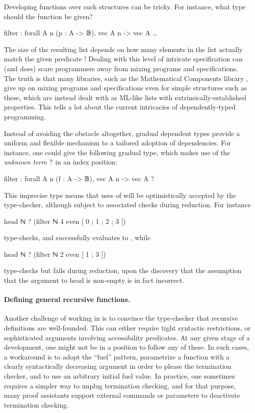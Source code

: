 Developing functions over such structures can be tricky. For instance, what type should the  function be given?
\begin{coqcode}
  filter : forall A n (p : A -> 𝔹), vec A n -> vec A …
\end{coqcode}
The size of the resulting list depends on how many elements in the list actually match the given predicate !
Dealing with this level of intricate specification can (and does) scare programmers away from mixing programs and specifications. The truth is that many libraries, such as the Mathematical
Components library ,
give up on mixing programs and specifications even for simple structures such as these, which are instead dealt with as ML-like lists with extrinsically-established properties. This
tells a lot about the current intricacies of dependently-typed programming.
  
Instead of avoiding the obstacle altogether, gradual dependent types provide a uniform and flexible mechanism to a tailored adoption of dependencies. For instance, one could give  the following gradual type, which makes use of the \emph{unknown term} $\mathbb{?}$
in an index position:
\begin{coqcode}
  filter : forall A n (f : A -> 𝔹), vec A n -> vec A ?
\end{coqcode}
This imprecise type means that uses of  will be optimistically accepted by the type-checker, although subject to associated checks during reduction. For instance
\begin{coqcode}
head ℕ ? (filter ℕ 4 even [ 0 ; 1 ; 2 ; 3 ])
\end{coqcode}
type-checks, and successfully evaluates to , while
\begin{coqcode}
head ℕ ? (filter ℕ 2 even [ 1 ; 3 ])
\end{coqcode}
type-checks but fails during reduction, upon the discovery that the assumption
that the argument to head is non-empty is in fact incorrect.

\paragraph{Defining general recursive functions.}
\label{ex:rec}

Another challenge of working in  is to convince the type-checker that recursive
definitions are well-founded.
This can either require tight syntactic restrictions, or sophisticated arguments involving
accessibility predicates. At any given stage of a development,
one might not be in a position to follow any of these.
In such cases, a workaround is to adopt the “fuel” pattern, \ie parametrize a function with
a clearly syntactically decreasing argument in order to please the termination checker,
and to use an arbitrary initial fuel value.
In practice, one sometimes requires a simpler way to unplug termination checking,
and for that purpose, many proof assistants support external commands or parameters to deactivate termination checking.%
%

